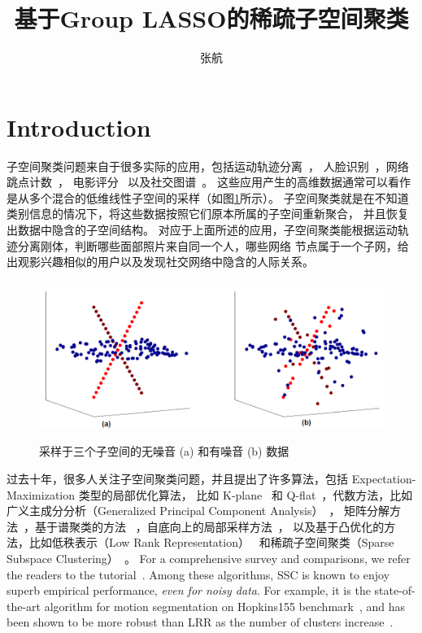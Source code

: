 \documentclass{ctexart}
\begin{document}
\title{基于Group LASSO的稀疏子空间聚类}
\author{张航}
\maketitle

\section{Introduction}

子空间聚类问题来自于很多实际的应用，包括运动轨迹分离~\cite{costeira1998motion_seg}，
人脸识别~\cite{basri2003lambertianface}，网络跳点计数~\cite{eriksson2011high_rankMC}，
电影评分~\cite{zhang2012RecSys} 以及社交图谱~\cite{xu2011graphclustering}。
这些应用产生的高维数据通常可以看作是从多个混合的低维线性子空间的采样（如图\ref{fig:Union_of_sub_model}所示）。
子空间聚类就是在不知道类别信息的情况下，将这些数据按照它们原本所属的子空间重新聚合，
并且恢复出数据中隐含的子空间结构。
对应于上面所述的应用，子空间聚类能根据运动轨迹分离刚体，判断哪些面部照片来自同一个人，哪些网络
节点属于一个子网，给出观影兴趣相似的用户以及发现社交网络中隐含的人际关系。

\begin{figure}
  \centering
  \includegraphics[width=0.8\linewidth]{pics/Union_of_Subspace.png}\\
  \caption{采样于三个子空间的无噪音 (a) 和有噪音 (b) 数据}\label{fig:Union_of_sub_model}
\end{figure}

过去十年，很多人关注子空间聚类问题，并且提出了许多算法，包括 Expectation-Maximization 类型的局部优化算法，
比如 K-plane~\cite{bradley2000k-plane} 和 Q-flat~\cite{tseng2000qflat}，代数方法，比如
广义主成分分析（Generalized Principal Component Analysis）~\cite{vidal2005gpca}，
矩阵分解方法~\cite{costeira1998motion_seg,costeira2000multibody_factorization}，基于谱聚类的方法
~\cite{lauer2009spectral,chen2009spectral}，自底向上的局部采样方法~\cite{yan2006LSA,rao2008motion}，
以及基于凸优化的方法，比如低秩表示（Low Rank Representation）~\cite{liu2010lrr_icml,liu2013LRR}
和稀疏子空间聚类（Sparse Subspace Clustering）~\cite{elhamifar2009ssc,elhamifar2012ssc_journal}。
For a comprehensive survey and comparisons, we refer the readers to the tutorial~\cite{vidal2011tutorial}. Among these algorithms, SSC is known to enjoy superb empirical performance, {\em even for noisy data}. For example, it
is the state-of-the-art algorithm for motion segmentation on Hopkins155 benchmark~\cite{tron2007benchmark,elhamifar2009ssc}, and has been shown to be more robust than LRR as the number of clusters increase~\cite{elhamifar2012ssc_journal}.
\end{document}
